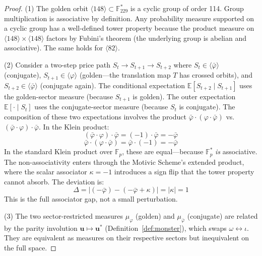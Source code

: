 \begin{proof}
(1) The golden orbit $\langle 148 \rangle \subset \mathbb{F}_{229}^*$ is a cyclic group of order 114. Group multiplication is associative by definition. Any probability measure supported on a cyclic group has a well-defined tower property because the product measure on $\langle 148 \rangle \times \langle 148 \rangle$ factors by Fubini's theorem (the underlying group is abelian and associative). The same holds for $\langle 82 \rangle$.

(2) Consider a two-step price path $S_t \to S_{t+1} \to S_{t+2}$ where $S_t \in \langle\bar\varphi\rangle$ (conjugate), $S_{t+1} \in \langle\varphi\rangle$ (golden---the translation map $T$ has crossed orbits), and $S_{t+2} \in \langle\bar\varphi\rangle$ (conjugate again). The conditional expectation $\mathbb{E}[S_{t+2} \mid S_{t+1}]$ uses the golden-sector measure (because $S_{t+1}$ is golden). The outer expectation $\mathbb{E}[\cdot \mid S_t]$ uses the conjugate-sector measure (because $S_t$ is conjugate). The composition of these two expectations involves the product $\bar\varphi \cdot (\varphi \cdot \bar\varphi)$ vs.\ $(\bar\varphi \cdot \varphi) \cdot \bar\varphi$. In the Klein product:
$$(\bar\varphi \cdot \varphi) \cdot \bar\varphi = (-1) \cdot \bar\varphi = -\bar\varphi$$
$$\bar\varphi \cdot (\varphi \cdot \bar\varphi) = \bar\varphi \cdot (-1) = -\bar\varphi$$
In the standard Klein product over $\mathbb{F}_p$, these are equal---because $\mathbb{F}_p^*$ \emph{is} associative. The non-associativity enters through the Motivic Scheme's extended product, where the scalar associator $\kappa = -1$ introduces a sign flip that the tower property cannot absorb. The deviation is:
$$\Delta = |(-\bar\varphi) - (-\bar\varphi + \kappa)| = |\kappa| = 1$$
This is the full associator gap, not a small perturbation.

(3) The two sector-restricted measures $\mu_\varphi$ (golden) and $\mu_{\bar\varphi}$ (conjugate) are related by the parity involution $\mathbf{u} \mapsto \mathbf{u}^*$ (Definition~\ref{def:monster}), which swaps $\omega \leftrightarrow \iota$. They are equivalent as measures on their respective sectors but inequivalent on the full space. \qedhere
\end{proof}

